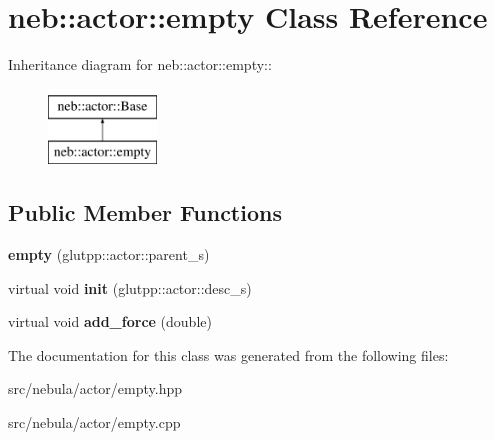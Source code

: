 \hypertarget{classneb_1_1actor_1_1empty}{
\section{neb::actor::empty Class Reference}
\label{classneb_1_1actor_1_1empty}
}
Inheritance diagram for neb::actor::empty::\begin{figure}[H]
\begin{center}
\leavevmode
\includegraphics[height=2cm]{classneb_1_1actor_1_1empty}
\end{center}
\end{figure}
\subsection*{Public Member Functions}
\begin{DoxyCompactItemize}
\item 
\hypertarget{classneb_1_1actor_1_1empty_a986bad0e65988e8561985a8500cc2bdb}{
{\bfseries empty} (glutpp::actor::parent\_\-s)}
\label{classneb_1_1actor_1_1empty_a986bad0e65988e8561985a8500cc2bdb}

\item 
\hypertarget{classneb_1_1actor_1_1empty_af37fc36906e3f7af421bd444a0378b0f}{
virtual void {\bfseries init} (glutpp::actor::desc\_\-s)}
\label{classneb_1_1actor_1_1empty_af37fc36906e3f7af421bd444a0378b0f}

\item 
\hypertarget{classneb_1_1actor_1_1empty_a6eccecdc239e1dfb40701d274000160d}{
virtual void {\bfseries add\_\-force} (double)}
\label{classneb_1_1actor_1_1empty_a6eccecdc239e1dfb40701d274000160d}

\end{DoxyCompactItemize}


The documentation for this class was generated from the following files:\begin{DoxyCompactItemize}
\item 
src/nebula/actor/empty.hpp\item 
src/nebula/actor/empty.cpp\end{DoxyCompactItemize}
